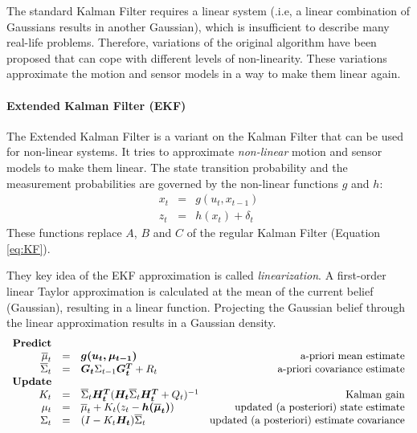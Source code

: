 {The standard Kalman Filter requires a linear system (.i.e, a linear combination of Gaussians results in another Gaussian), which is insufficient to describe many real-life problems.
Therefore, variations of the original algorithm have been proposed that can cope with different levels of non-linearity.
These variations approximate the motion and sensor models in a way to make them linear again.

\paragraph{Extended Kalman Filter (EKF)}
The Extended Kalman Filter is a variant on the Kalman Filter that can be used for non-linear systems.
It tries to approximate \textit{non-linear} motion and sensor models to make them linear.
The state transition probability and the measurement probabilities are governed by the non-linear functions $g$ and $h$:
\begin{equation}
\begin{array}{rcl}
x_t & = & g(u_t, x_{t-1}) \\
z_t & = & h(x_t) + \delta_t
\end{array}
\end{equation}
These functions replace $A$, $B$ and $C$ of the regular Kalman Filter (Equation \ref{eq:KF}).

They key idea of the EKF approximation is called \textit{linearization}.
A first-order linear Taylor approximation is calculated at the mean of the current belief (Gaussian), resulting in a linear function.
Projecting the Gaussian belief through the linear approximation results in a Gaussian density.
\begin{equation}
\begin{array}{rclr}
\text{\textbf{Predict}} \\
\overline{\mu}_t & = & \boldsymbol{g(u_t, \mu_{t-1})} & \text{a-priori mean estimate} \\
\overline{\Sigma}_t & = & \boldsymbol{G_t} \Sigma_{t-1} \boldsymbol{G_t^T} + R_t  & \text{a-priori covariance estimate} \\
\text{\textbf{Update}} \\
K_t & = & \overline{\Sigma}_t \boldsymbol{H_t^T} (\boldsymbol{H_t} \overline{\Sigma}_t \boldsymbol{H_t^T} + Q_t)^{-1} & \text{Kalman gain} \\
\mu_t & = & \overline{\mu}_t + K_t(z_t - \boldsymbol{h(\overline{\mu}_t)}) & \text{updated (a posteriori) state estimate} \\
\Sigma_t & = & (I - K_t \boldsymbol{H_t}) \overline{\Sigma}_t & \text{updated (a posteriori) estimate covariance}
\end{array}
\end{equation}

}
